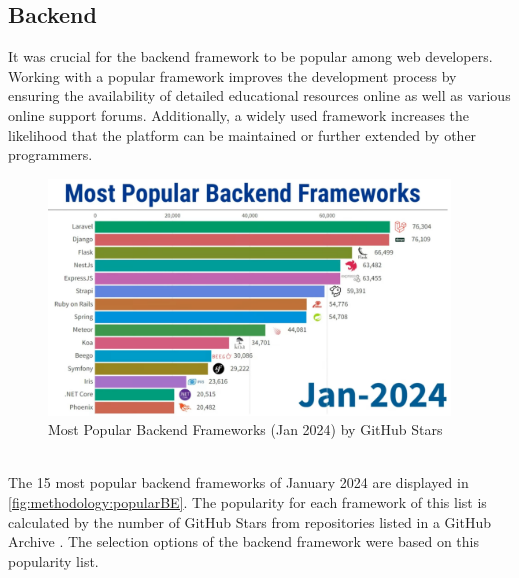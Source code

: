 \subsection{Backend}
\label{subsec:methodology:frameworks:backend}
It was crucial for the backend framework to be popular among web developers. Working with a popular framework improves the development process by ensuring the availability of detailed educational resources online as well as various online support forums. Additionally, a widely used framework increases the likelihood that the platform can be maintained or further extended by other programmers.
\begin{figure}[htbp]
 \centering
 \includegraphics[width=0.95\textwidth]{gfx/figures/Popular_BE.png}
 \caption{Most Popular Backend Frameworks (Jan 2024) by GitHub Stars \cite{backend:popularity}}
 \label{fig:methodology:popularBE}
\end{figure}
~\\
The 15 most popular backend frameworks of January 2024 are displayed in \autoref{fig:methodology:popularBE}. The popularity for each framework of this list is calculated by the number of GitHub Stars from repositories listed in a GitHub Archive \cite{backend:popularity}. The selection options of the backend framework were based on this popularity list.

